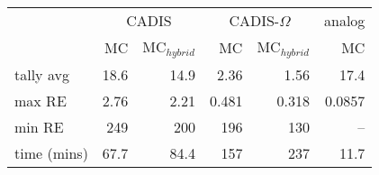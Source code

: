 \begin{tabular}{lrrrrr}
\toprule
{} & \multicolumn{2}{c}{CADIS}   & \multicolumn{2}{c}{CADIS-$\Omega$}  & analog \\
{} &    MC & MC$_{hybrid}$ &         MC & MC$_{hybrid}$ &     MC \\
\midrule
tally avg   &  18.6 &        14.9 &       2.36 &        1.56 &   17.4 \\
max RE      &  2.76 &        2.21 &      0.481 &       0.318 & 0.0857 \\
min RE      &   249 &         200 &        196 &         130 &    -- \\
time (mins) &  67.7 &        84.4 &        157 &         237 &   11.7 \\
\bottomrule
\end{tabular}
